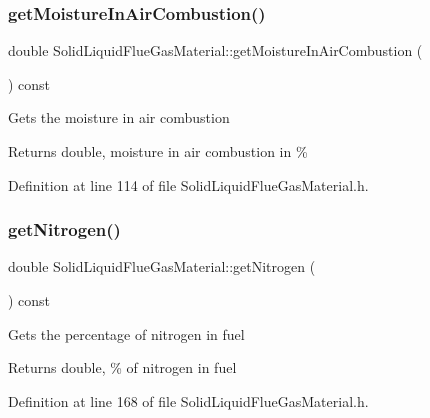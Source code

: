 \subsubsection{\texorpdfstring{get\+Moisture\+In\+Air\+Combustion()}{getMoistureInAirCombustion()}\hspace{0.1cm}{\footnotesize\ttfamily [3/3]}}
{\footnotesize\ttfamily double Solid\+Liquid\+Flue\+Gas\+Material\+::get\+Moisture\+In\+Air\+Combustion (\begin{DoxyParamCaption}{ }\end{DoxyParamCaption}) const\hspace{0.3cm}{\ttfamily [inline]}}

Gets the moisture in air combustion \begin{DoxyReturn}{Returns}
double, moisture in air combustion in \% 
\end{DoxyReturn}


Definition at line 114 of file Solid\+Liquid\+Flue\+Gas\+Material.\+h.

\mbox{\label{class_solid_liquid_flue_gas_material_a76159a5d9d609f0e0131f7bca3b60ebc}} 
\subsubsection{\texorpdfstring{get\+Nitrogen()}{getNitrogen()}\hspace{0.1cm}{\footnotesize\ttfamily [1/3]}}
{\footnotesize\ttfamily double Solid\+Liquid\+Flue\+Gas\+Material\+::get\+Nitrogen (\begin{DoxyParamCaption}{ }\end{DoxyParamCaption}) const\hspace{0.3cm}{\ttfamily [inline]}}

Gets the percentage of nitrogen in fuel \begin{DoxyReturn}{Returns}
double, \% of nitrogen in fuel 
\end{DoxyReturn}


Definition at line 168 of file Solid\+Liquid\+Flue\+Gas\+Material.\+h.

\mbox{\label{class_solid_liquid_flue_gas_material_a76159a5d9d609f0e0131f7bca3b60ebc}} 
